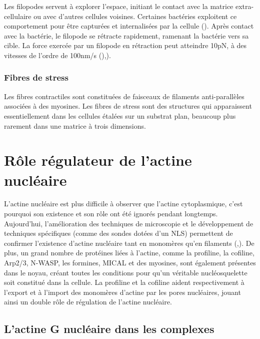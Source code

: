 \documentclass{report}
\begin{document}
Les filopodes servent à explorer l'espace, initiant le contact avec la matrice extra-cellulaire ou avec d'autres cellules voisines. 
Certaines bactéries exploitent ce comportement pour être capturées et internalisées par la cellule (\cite{romero_atp-mediated_2011}). 
Après contact avec la bactérie, le filopode se rétracte rapidement, ramenant la bactérie vers sa cible.
La force exercée par un filopode en rétraction peut atteindre 10pN, à des vitesses de l'ordre de 100nm/s (\cite{vonna_micromechanics_2007}),\cite{romero_atp-mediated_2011}). 



\subsubsection{Fibres de stress}

Les fibres contractiles sont constituées de faisceaux de filaments anti-parallèles associées à des myosines. 
Les fibres de stress sont des structures qui apparaissent essentiellement dans les cellules étalées sur un substrat plan, beaucoup plus rarement dans une matrice à trois dimensions. 

\section{Rôle régulateur de l'actine nucléaire}

L'actine nucléaire est plus difficile à observer que l'actine cytoplasmique, c'est pourquoi son existence et son rôle ont été ignorés pendant longtemps. 
Aujourd'hui, l'amélioration des techniques de microscopie et le développement de techniques spécifiques (comme des sondes dotées d'un NLS) permettent de confirmer l'existence d'actine nucléaire tant en monomères qu'en filaments (\cite{mcdonald_nucleoplasmic_2006},\cite{baarlink_nuclear_2013}). 
De plus, un grand nombre de protéines liées à l'actine, comme la profiline, la cofiline, Arp2/3, N-WASP, les formines, MICAL et des myosines, sont également présentes dans le noyau, créant toutes les conditions pour qu'un véritable nucléosquelette soit constitué dans la cellule. 
La profiline et la cofiline aident respectivement à l'export et à l'import des monomères d'actine par les pores nucléaires, jouant ainsi un double rôle de régulation de l'actine nucléaire. 


\subsection{L'actine G nucléaire dans les complexes}
\end{document}
